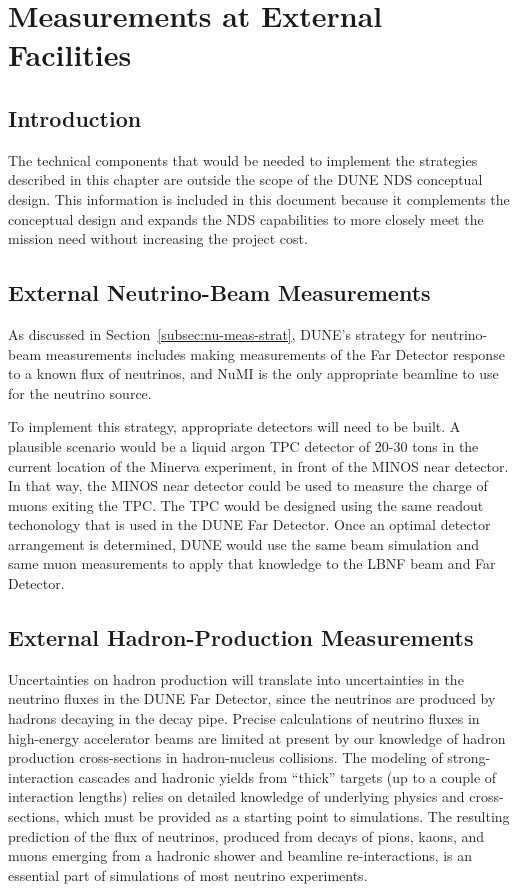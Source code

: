 
\chapter{Measurements at External Facilities}
\label{ch:nd-external-meas}

\section{Introduction}

The technical components that would be needed to implement the strategies 
described in this chapter are outside the scope of the DUNE NDS conceptual 
design. This information is included in this document because it complements the conceptual 
design and expands the NDS capabilities to more closely meet the mission need without increasing the project cost.


\section{External Neutrino-Beam Measurements}
\label{sec:nd-external-beam}

As discussed in Section~\ref{subsec:nu-meas-strat}, DUNE's strategy for neutrino-beam measurements includes making measurements of the Far Detector response to a known flux of neutrinos, and NuMI is the only appropriate beamline to use for the neutrino source.

To implement this strategy, appropriate detectors will need to be built.  A plausible scenario would be a liquid argon TPC detector of 20-30 tons in the current location of the Minerva experiment, in front of the MINOS near detector. In that way, the MINOS near detector could be used to measure the charge of muons exiting the TPC. The TPC would be designed using the same readout techonology that is used in the DUNE Far Detector.  Once an optimal detector arrangement is determined, DUNE would use the same beam simulation and same muon measurements to apply that knowledge to the LBNF beam and Far Detector.

\section{External Hadron-Production Measurements}
\label{sec:nd-external-hadron}

Uncertainties on hadron production will translate into uncertainties in the neutrino fluxes
in the DUNE Far Detector, since the neutrinos are produced by hadrons decaying in the decay pipe.
Precise calculations of neutrino fluxes in high-energy accelerator beams are limited
at present by our knowledge of hadron production cross-sections in hadron-nucleus collisions. 
The modeling of strong-interaction cascades and hadronic yields from ``thick'' targets
(up to a couple of interaction lengths) relies on detailed knowledge of underlying physics
and cross-sections, which must be provided as a starting point to simulations. The resulting 
prediction of the flux of neutrinos, produced from decays of pions, kaons, and muons
emerging from a hadronic shower and beamline re-interactions, is an essential part
of simulations of most neutrino experiments. 

